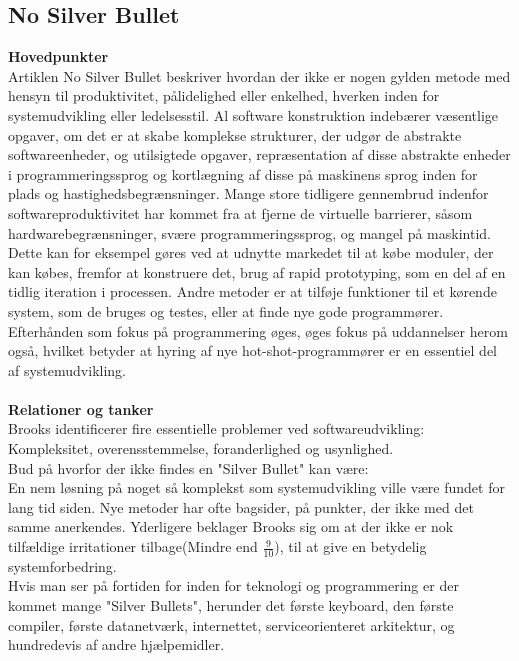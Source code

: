 \documentclass[a4paper]{article}
\begin{document}
\subsection{No Silver Bullet}
\textbf{Hovedpunkter}\\
Artiklen No Silver Bullet beskriver hvordan der ikke er nogen gylden metode med hensyn til produktivitet, pålidelighed eller enkelhed, hverken inden for systemudvikling eller ledelsesstil. Al software konstruktion indebærer væsentlige opgaver, om det er at skabe komplekse strukturer, der udgør de abstrakte softwareenheder, og utilsigtede opgaver, repræsentation af disse abstrakte enheder i programmeringssprog og kortlægning af disse på maskinens sprog inden for plads og hastighedsbegrænsninger. Mange store tidligere gennembrud indenfor softwareproduktivitet har kommet fra at fjerne de virtuelle barrierer, såsom hardwarebegrænsninger, svære programmeringssprog, og mangel på maskintid. Dette kan for eksempel gøres ved at udnytte markedet til at købe moduler, der kan købes, fremfor at konstruere det, brug af rapid prototyping, som en del af en tidlig iteration i processen. Andre metoder er at tilføje funktioner til et kørende system, som de bruges og testes, eller at finde nye gode programmører. Efterhånden som fokus på programmering øges, øges fokus på uddannelser herom også, hvilket betyder at hyring af nye hot-shot-programmører er en essentiel del af systemudvikling.\\\\
\textbf{Relationer og tanker}\\
Brooks identificerer fire essentielle problemer ved softwareudvikling: Kompleksitet, overensstemmelse, foranderlighed og usynlighed.\\
Bud på hvorfor der ikke findes en "Silver Bullet" kan være: \\
En nem løsning på noget så komplekst som systemudvikling ville være fundet for lang tid siden. Nye metoder har ofte bagsider, på punkter, der ikke med det samme anerkendes. Yderligere beklager Brooks sig om at der ikke er nok tilfældige irritationer tilbage(Mindre end $\frac{9}{10}$), til at give en betydelig systemforbedring. \\
Hvis man ser på fortiden for inden for teknologi og programmering er der kommet mange "Silver Bullets", herunder det første keyboard, den første compiler, første datanetværk, internettet, serviceorienteret arkitektur, og hundredevis af andre hjælpemidler.
\newpage
\end{document}
